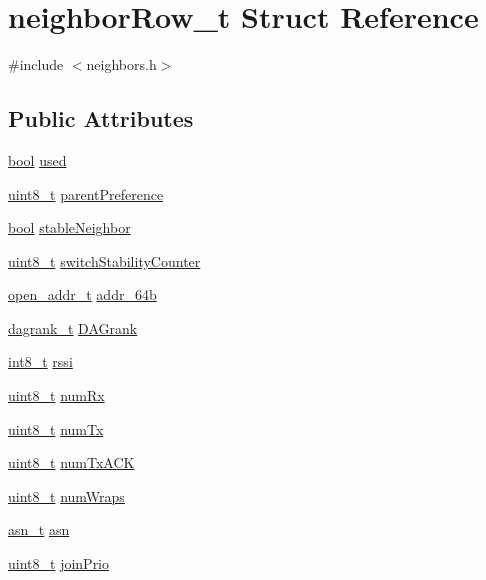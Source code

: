 \hypertarget{structneighbor_row__t}{}\section{neighbor\+Row\+\_\+t Struct Reference}
\label{structneighbor_row__t}


{\ttfamily \#include $<$neighbors.\+h$>$}

\subsection*{Public Attributes}
\begin{DoxyCompactItemize}
\item 
\hyperlink{_p_e___types_8h_a97a80ca1602ebf2303258971a2c938e2}{bool} \hyperlink{structneighbor_row__t_a1803ce6d1b32a8f05590181c2aac294e}{used}
\item 
\hyperlink{_p_e___types_8h_aba7bc1797add20fe3efdf37ced1182c5}{uint8\+\_\+t} \hyperlink{structneighbor_row__t_a70846bebfcf4c7fa48be949dd09dc267}{parent\+Preference}
\item 
\hyperlink{_p_e___types_8h_a97a80ca1602ebf2303258971a2c938e2}{bool} \hyperlink{structneighbor_row__t_ae1bc269fa782bead16bae4b97370efd3}{stable\+Neighbor}
\item 
\hyperlink{_p_e___types_8h_aba7bc1797add20fe3efdf37ced1182c5}{uint8\+\_\+t} \hyperlink{structneighbor_row__t_aaba53adc47888065ae6875f27b9b3f48}{switch\+Stability\+Counter}
\item 
\hyperlink{structopen__addr__t}{open\+\_\+addr\+\_\+t} \hyperlink{structneighbor_row__t_ad1f8fd4f98531eb454c37204e7a03f66}{addr\+\_\+64b}
\item 
\hyperlink{opendefs_8h_a502861d0bb432f5702761bd854023e21}{dagrank\+\_\+t} \hyperlink{structneighbor_row__t_a1678b7967801f6e5f3d8822d744fba55}{D\+A\+Grank}
\item 
\hyperlink{_p_e___types_8h_aef44329758059c91c76d334e8fc09700}{int8\+\_\+t} \hyperlink{structneighbor_row__t_a28b7a03233c1e2514325e44abe51a0e6}{rssi}
\item 
\hyperlink{_p_e___types_8h_aba7bc1797add20fe3efdf37ced1182c5}{uint8\+\_\+t} \hyperlink{structneighbor_row__t_aa655c4ca496992288461e0941ad9bd4b}{num\+Rx}
\item 
\hyperlink{_p_e___types_8h_aba7bc1797add20fe3efdf37ced1182c5}{uint8\+\_\+t} \hyperlink{structneighbor_row__t_a20e93cf14baf41608d344892ae840b4d}{num\+Tx}
\item 
\hyperlink{_p_e___types_8h_aba7bc1797add20fe3efdf37ced1182c5}{uint8\+\_\+t} \hyperlink{structneighbor_row__t_a880aa94e85c0b516c779ac0ea16f3305}{num\+Tx\+A\+CK}
\item 
\hyperlink{_p_e___types_8h_aba7bc1797add20fe3efdf37ced1182c5}{uint8\+\_\+t} \hyperlink{structneighbor_row__t_ac1a1d7e09465447680f7243202c3430b}{num\+Wraps}
\item 
\hyperlink{structasn__t}{asn\+\_\+t} \hyperlink{structneighbor_row__t_af7a02d223c38539667aead0fe666907b}{asn}
\item 
\hyperlink{_p_e___types_8h_aba7bc1797add20fe3efdf37ced1182c5}{uint8\+\_\+t} \hyperlink{structneighbor_row__t_a3f8bb0fa7e177f8c3a4f6a27360ee178}{join\+Prio}
\end{DoxyCompactItemize}


